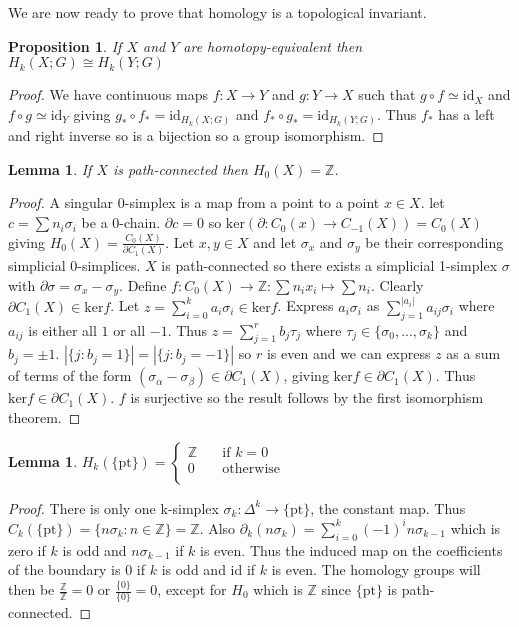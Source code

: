 \documentclass{article}
\newtheorem{lemma}[theorem]{Lemma}
\newtheorem{proposition}[theorem]{Proposition}
\begin{document}
\noindent We are now ready to prove that homology is a topological invariant.
\begin{proposition}
If $X$ and $Y$ are homotopy-equivalent then $H_k(X;G)\cong H_k(Y;G)$
\end{proposition}
\begin{proof}
We have continuous maps $f\colon X\to Y$ and $g\colon Y\to X$ such that $g\circ f\simeq\text{id}_X$ and $f\circ g\simeq\text{id}_Y$ giving $g_*\circ f_*=\text{id}_{H_k(X;G)}$ and $f_*\circ g_*=\text{id}_{H_k(Y;G)}$. Thus $f_*$ has a left and right inverse so is a bijection so a group isomorphism.
\end{proof}

\begin{lemma}
If $X$ is path-connected then $H_0(X)=\mathbb{Z}$.
\end{lemma}
\begin{proof}
A singular 0-simplex is a map from a point to a point $x\in X$. let $c=\sum n_i\sigma_i$ be a 0-chain. $\partial c=0$ so $\text{ker}(\partial:C_{0}(x)\rightarrow C_{-1}(X))=C_0(X)$ giving $H_0(X)=\frac{C_0(X)}{\partial C_1(X)}$. Let $x,y\in X$ and let $\sigma_x$ and $\sigma_y$ be their corresponding simplicial 0-simplices. $X$ is path-connected so there exists a simplicial 1-simplex $\sigma$ with $\partial\sigma=\sigma_x-\sigma_y$. Define $f\colon C_0(X)\to\mathbb{Z}:\sum n_ix_i\mapsto\sum n_i$. Clearly $\partial C_1(X)\in \text{ker}f$. Let $z=\sum_{i=0}^ka_i\sigma_i\in\text{ker}f$. Express $a_i\sigma_i$ as $\sum_{j=1}^{|a_i|}a_{ij}\sigma_i$ where $a_{ij}$ is either all $1$ or all $-1$. Thus $z=\sum_{j=1}^rb_j\tau_j$ where $\tau_j\in\{\sigma_0,...,\sigma_k\}$ and $b_j=\pm1$. $|\{j:b_j=1\}|=|\{j:b_j=-1\}|$ so $r$ is even and we can express $z$ as a sum of terms of the form $(\sigma_\alpha - \sigma_\beta)\in\partial C_1(X)$, giving $\text{ker}f\in\partial C_1(X)$. Thus $\text{ker}f\in\partial C_1(X)$. $f$ is surjective so the result follows by the first isomorphism theorem.
\end{proof}

\begin{lemma}
$H_k(\{\text{pt}\})=\begin{cases}
       \mathbb{Z} &\quad\text{if }k=0 \\
       0 &\quad\text{otherwise} \\ 
     \end{cases}$
\end{lemma}
\begin{proof}
There is only one k-simplex $\sigma_k\colon\Delta^k\rightarrow \{\text{pt}\}$, the constant map. Thus $C_k(\{\text{pt}\})=\{n\sigma_k:n\in\mathbb{Z}\}=\mathbb{Z}$.
Also $\partial_k(n\sigma_k)=\sum_{i=0}^k(-1)^i n\sigma_{k-1}$ which is zero if $k$ is odd and $n\sigma_{k-1}$ if $k$ is even. Thus the induced map on the coefficients of the boundary is $0$ if $k$ is odd and id if $k$ is even. The homology groups will then be $\frac{\mathbb{Z}}{\mathbb{Z}}=0$ or $\frac{\{0\}}{\{0\}}=0$, except for $H_0$ which is $\mathbb{Z}$ since $\{\text{pt}\}$ is path-connected.
\end{proof}
\end{document}
